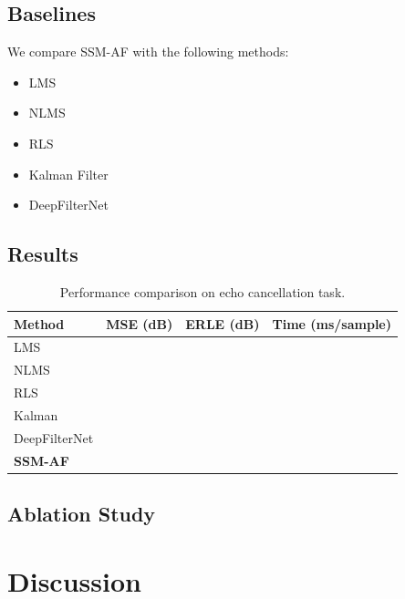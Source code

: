 \documentclass[a4paper,fleqn]{cas-sc}
\begin{document}
\subsection{Baselines}

We compare SSM-AF with the following methods:
\begin{itemize}
\item LMS~\citep{widrow1960adaptive}
\item NLMS~\citep{nagumo1967weight}
\item RLS~\citep{sayed2003fundamentals}
\item Kalman Filter~\citep{haykin2002adaptive}
\item DeepFilterNet~\citep{schroeter2022deepfilternet}
\end{itemize}

\subsection{Results}


\begin{table}[t]
\caption{Performance comparison on echo cancellation task.}\label{tab:echo}
\begin{tabular*}{\tblwidth}{@{}lccc@{}}
\toprule
Method & MSE (dB) & ERLE (dB) & Time (ms/sample) \\
\midrule
LMS & & & \\
NLMS & & & \\
RLS & & & \\
Kalman & & & \\
DeepFilterNet & & & \\
\textbf{SSM-AF} & & & \\
\bottomrule
\end{tabular*}
\end{table}

\subsection{Ablation Study}



\section{Discussion}\label{sec:discussion}
\end{document}
